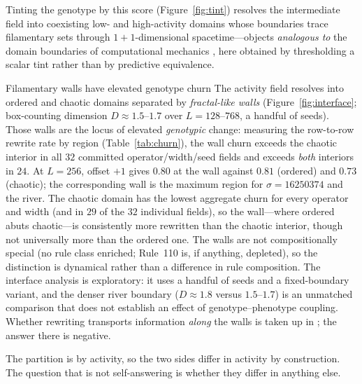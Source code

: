 \documentclass[man,12pt,floatsintext,donotrepeattitle]{apa7}
\newcommand{\secref}[1]{\emph{\nameref{#1}}}
\begin{document}
Tinting the genotype by this score (Figure~\ref{fig:tint}) resolves the
intermediate field into coexisting low- and high-activity domains whose
boundaries trace filamentary sets through $1{+}1$-dimensional spacetime---objects
\emph{analogous to} the domain boundaries of computational mechanics
\parencite{crutchfield1989inferring,shalizi2001computational}, here obtained by
thresholding a scalar tint rather than by predictive equivalence.

\begin{empiricalfinding}[label={find:walls}]{Filamentary walls have elevated genotype churn}
The activity field resolves into ordered and chaotic domains separated by
\emph{fractal-like walls} (Figure~\ref{fig:interface}; box-counting dimension
$D \approx 1.5$--$1.7$ over $L = 128$--$768$, a handful of seeds). Those walls are
the locus of elevated \emph{genotypic} change: measuring the row-to-row rewrite
rate by region (Table~\ref{tab:churn}), the wall churn exceeds the chaotic
interior in all $32$ committed operator/width/seed fields and exceeds
\emph{both} interiors in $24$. At $L = 256$, offset $+1$ gives $0.80$ at the
wall against $0.81$ (ordered) and $0.73$ (chaotic); the corresponding wall is
the maximum region for $\sigma=16250374$ and the river. The chaotic domain has
the lowest aggregate churn for every operator and width (and in $29$ of the
$32$ individual fields), so the wall---where ordered abuts chaotic---is
consistently more rewritten than the chaotic interior, though not universally
more than the ordered one. The walls are not compositionally special (no rule
class enriched; Rule~110 is, if anything, depleted), so the distinction is
dynamical rather than a difference in rule composition. The interface analysis
is exploratory: it uses a handful of seeds and a fixed-boundary variant, and
the denser river boundary ($D\approx1.8$ versus $1.5$--$1.7$) is an unmatched
comparison that does not establish an effect of genotype--phenotype coupling.
Whether rewriting transports information \emph{along} the walls is taken up in
\secref{sec:eoc-compute}; the answer there is negative.
\end{empiricalfinding}

The partition is by activity, so the two sides differ in activity by
construction. The question that is not self-answering is whether they differ in
anything else.
\end{document}
